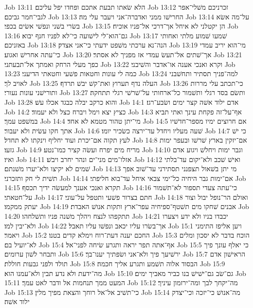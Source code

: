Job 13:11  הלא שׂאתו תבעת אתכם ופחדו יפל עליכם׃
Job 13:12  זכרניכם משׁלי־אפר לגבי־חמר גביכם׃
Job 13:13  החרישׁו ממני ואדברה־אני ויעבר עלי מה׃
Job 13:14  על־מה אשׂא בשׂרי בשׁני ונפשׁי אשׂים בכפי׃
Job 13:15  הן יקטלני לא איחל אך־דרכי אל־פניו אוכיח׃
Job 13:16  גם־הוא־לי לישׁועה כי־לא לפניו חנף יבוא׃
Job 13:17  שׁמעו שׁמוע מלתי ואחותי באזניכם׃
Job 13:18  הנה־נא ערכתי משׁפט ידעתי כי־אני אצדק׃
Job 13:19  מי־הוא יריב עמדי כי־עתה אחרישׁ ואגוע׃
Job 13:20  אך־שׁתים אל־תעשׂ עמדי אז מפניך לא אסתר׃
Job 13:21  כפך מעלי הרחק ואמתך אל־תבעתני׃
Job 13:22  וקרא ואנכי אענה או־אדבר והשׁיבני׃
Job 13:23  כמה לי עונות וחטאות פשׁעי וחטאתי הדיעני׃
Job 13:24  למה־פניך תסתיר ותחשׁבני לאויב לך׃
Job 13:25  העלה נדף תערוץ ואת־קשׁ יבשׁ תרדף׃
Job 13:26  כי־תכתב עלי מררות ותורישׁני עונות נעורי׃
Job 13:27  ותשׂם בסד רגלי ותשׁמור כל־ארחותי על־שׁרשׁי רגלי תתחקה׃
Job 13:28  והוא כרקב יבלה כבגד אכלו עשׁ׃
Job 14:1  אדם ילוד אשׁה קצר ימים ושׂבע־רגז׃
Job 14:2  כציץ יצא וימל ויברח כצל ולא יעמוד׃
Job 14:3  אף־על־זה פקחת עינך ואתי תביא במשׁפט עמך׃
Job 14:4  מי־יתן טהור מטמא לא אחד׃
Job 14:5  אם חרוצים ימיו מספר־חדשׁיו אתך חקו עשׂית ולא יעבור׃
Job 14:6  שׁעה מעליו ויחדל עד־ירצה כשׂכיר יומו׃
Job 14:7  כי ישׁ לעץ תקוה אם־יכרת ועוד יחליף וינקתו לא תחדל׃
Job 14:8  אם־יזקין בארץ שׁרשׁו ובעפר ימות גזעו׃
Job 14:9  מריח מים יפרח ועשׂה קציר כמו־נטע׃
Job 14:10  וגבר ימות ויחלשׁ ויגוע אדם ואיו׃
Job 14:11  אזלו־מים מני־ים ונהר יחרב ויבשׁ׃
Job 14:12  ואישׁ שׁכב ולא־יקום עד־בלתי שׁמים לא יקיצו ולא־יערו משׁנתם׃
Job 14:13  מי יתן בשׁאול תצפנני תסתירני עד־שׁוב אפך תשׁית לי חק ותזכרני׃
Job 14:14  אם־ימות גבר היחיה כל־ימי צבאי איחל עד־בוא חליפתי׃
Job 14:15  תקרא ואנכי אענך למעשׂה ידיך תכסף׃
Job 14:16  כי־עתה צעדי תספור לא־תשׁמור על־חטאתי׃
Job 14:17  חתם בצרור פשׁעי ותטפל על־עוני׃
Job 14:18  ואולם הר־נופל יבול וצור יעתק ממקמו׃
Job 14:19  אבנים שׁחקו מים תשׁטף־ספיחיה עפר־ארץ ותקות אנושׁ האבדת׃
Job 14:20  תתקפהו לנצח ויהלך משׁנה פניו ותשׁלחהו׃
Job 14:21  יכבדו בניו ולא ידע ויצערו ולא־יבין למו׃
Job 14:22  אך־בשׂרו עליו יכאב ונפשׁו עליו תאבל׃
Job 15:1  ויען אליפז התימני ויאמר׃
Job 15:2  החכם יענה דעת־רוח וימלא קדים בטנו׃
Job 15:3  הוכח בדבר לא יסכון ומלים לא־יועיל בם׃
Job 15:4  אף־אתה תפר יראה ותגרע שׂיחה לפני־אל׃
Job 15:5  כי יאלף עונך פיך ותבחר לשׁון ערומים׃
Job 15:6  ירשׁיעך פיך ולא־אני ושׂפתיך יענו־בך׃
Job 15:7  הראישׁון אדם תולד ולפני גבעות חוללת׃
Job 15:8  הבסוד אלוה תשׁמע ותגרע אליך חכמה׃
Job 15:9  מה־ידעת ולא נדע תבין ולא־עמנו הוא׃
Job 15:10  גם־שׂב גם־ישׁישׁ בנו כביר מאביך ימים׃
Job 15:11  המעט ממך תנחמות אל ודבר לאט עמך׃
Job 15:12  מה־יקחך לבך ומה־ירזמון עיניך׃
Job 15:13  כי־תשׁיב אל־אל רוחך והצאת מפיך מלין׃
Job 15:14  מה־אנושׁ כי־יזכה וכי־יצדק ילוד אשׁה׃
